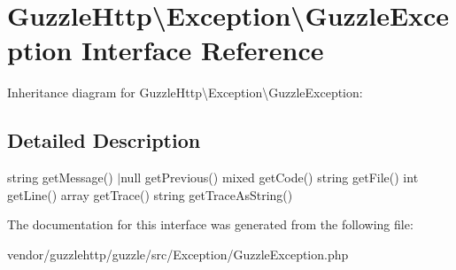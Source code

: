 \hypertarget{interfaceGuzzleHttp_1_1Exception_1_1GuzzleException}{}\section{Guzzle\+Http\textbackslash{}Exception\textbackslash{}Guzzle\+Exception Interface Reference}
\label{interfaceGuzzleHttp_1_1Exception_1_1GuzzleException}


Inheritance diagram for Guzzle\+Http\textbackslash{}Exception\textbackslash{}Guzzle\+Exception\+:


\subsection{Detailed Description}
string get\+Message()  $\vert$null get\+Previous()  mixed get\+Code()  string get\+File()  int get\+Line()  array get\+Trace()  string get\+Trace\+As\+String() 

The documentation for this interface was generated from the following file\+:\begin{DoxyCompactItemize}
\item 
vendor/guzzlehttp/guzzle/src/\+Exception/Guzzle\+Exception.\+php\end{DoxyCompactItemize}
